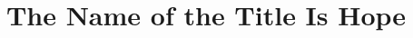 \documentclass{acmart-COPS}
\title{The Name of the Title Is Hope}
\begin{document}
\maketitle









\begin{acks}

\end{acks}

\balance


\end{document}
